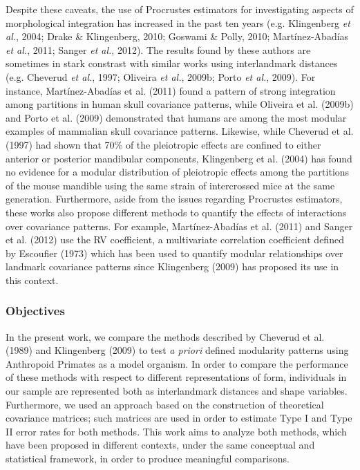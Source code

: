 \documentclass[12pt,twoside]{report}
\begin{document}
Despite these caveats, the use of Procrustes estimators for
investigating aspects of morphological integration has increased in the
past ten years (e.g. Klingenberg \emph{et al.}, 2004; Drake \&
Klingenberg, 2010; Goswami \& Polly, 2010; Martínez-Abadías \emph{et
al.}, 2011; Sanger \emph{et al.}, 2012). The results found by these
authors are sometimes in stark constrast with similar works using
interlandmark distances (e.g. Cheverud \emph{et al.}, 1997; Oliveira
\emph{et al.}, 2009b; Porto \emph{et al.}, 2009). For instance,
Martínez-Abadías et al. (2011) found a pattern of strong integration
among partitions in human skull covariance patterns, while Oliveira et
al. (2009b) and Porto et al. (2009) demonstrated that humans are among
the most modular examples of mammalian skull covariance patterns.
Likewise, while Cheverud et al. (1997) had shown that 70\% of the
pleiotropic effects are confined to either anterior or posterior
mandibular components, Klingenberg et al. (2004) has found no evidence
for a modular distribution of pleiotropic effects among the partitions
of the mouse mandible using the same strain of intercrossed mice at the
same generation. Furthermore, aside from the issues regarding Procrustes
estimators, these works also propose different methods to quantify the
effects of interactions over covariance patterns. For example,
Martínez-Abadías et al. (2011) and Sanger et al. (2012) use the RV
coefficient, a multivariate correlation coefficient defined by Escoufier
(1973) which has been used to quantify modular relationships over
landmark covariance patterns since Klingenberg (2009) has proposed its
use in this context.

\subsubsection{Objectives}\label{objectives}

In the present work, we compare the methods described by Cheverud et al.
(1989) and Klingenberg (2009) to test \emph{a priori} defined modularity
patterns using Anthropoid Primates as a model organism. In order to
compare the performance of these methods with respect to different
representations of form, individuals in our sample are represented both
as interlandmark distances and shape variables. Furthermore, we used an
approach based on the construction of theoretical covariance matrices;
such matrices are used in order to estimate Type I and Type II error
rates for both methods. This work aims to analyze both methods, which
have been proposed in different contexts, under the same conceptual and
statistical framework, in order to produce meaningful comparisons.
\end{document}
